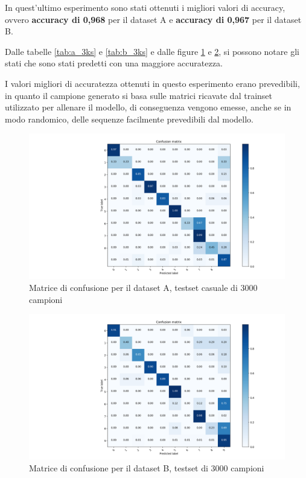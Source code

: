 \documentclass[10pt,a4paper]{article}
\begin{document}
	In quest'ultimo esperimento sono stati ottenuti i migliori valori di accuracy, ovvero \textbf{accuracy di 0,968} per il dataset A e \textbf{accuracy di 0,967} per il dataset B.

	Dalle tabelle \ref{tab:a_3ks} e \ref{tab:b_3ks} e dalle figure \ref{fig:a_3ks} e \ref{fig:b_3ks}, si possono notare gli stati che sono stati predetti con una maggiore accuratezza.

	I valori migliori di accuratezza ottenuti in questo esperimento erano prevedibili, in quanto il campione generato si basa sulle matrici ricavate dal trainset utilizzato per allenare il modello, di conseguenza vengono emesse, anche se in modo randomico, delle sequenze facilmente prevedibili dal modello.




	\begin{figure}[!htbp]
	\includegraphics[width=\linewidth]{immagini/confusion_matrix/a_3ks.png}
	\caption{Matrice di confusione per il dataset A, testset casuale di 3000 campioni}
	\label{fig:a_3ks}
	\end{figure}

	\begin{figure}[!htbp]
	\includegraphics[width=\linewidth]{immagini/confusion_matrix/b_3ks.png}
	\caption{Matrice di confusione per il dataset B, testset di 3000 campioni}
	\label{fig:b_3ks}
	\end{figure}
\end{document}
